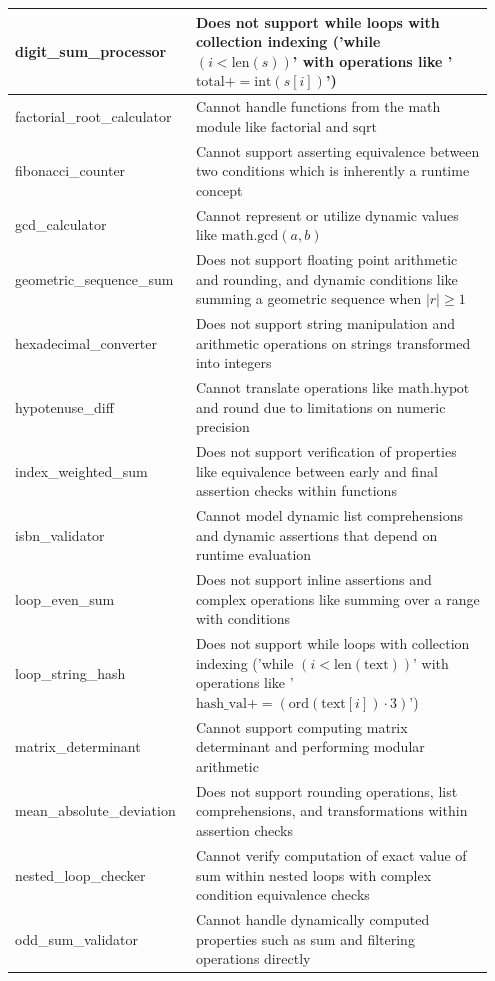 \documentclass[8pt]{extarticle}
\begin{document}
\begin{table}[H]
\begin{tabular}{|p{0.35\linewidth}|p{0.6\linewidth}|}
\hline
digit\_sum\_processor & Does not support while loops with collection indexing ('while $(i < \text{len}(s))$' with operations like '$\text{total} += \text{int}(s[i])$') \\
\hline
factorial\_root\_calculator & Cannot handle functions from the math module like $\text{factorial}$ and $\text{sqrt}$ \\
\hline
fibonacci\_counter & Cannot support asserting equivalence between two conditions which is inherently a runtime concept \\
\hline
gcd\_calculator & Cannot represent or utilize dynamic values like $\text{math.gcd}(a, b)$ \\
\hline
geometric\_sequence\_sum & Does not support floating point arithmetic and rounding, and dynamic conditions like summing a geometric sequence when $|r| \geq 1$ \\
\hline
hexadecimal\_converter & Does not support string manipulation and arithmetic operations on strings transformed into integers \\
\hline
hypotenuse\_diff & Cannot translate operations like $\text{math.hypot}$ and $\text{round}$ due to limitations on numeric precision \\
\hline
index\_weighted\_sum & Does not support verification of properties like equivalence between early and final assertion checks within functions \\
\hline
isbn\_validator & Cannot model dynamic list comprehensions and dynamic assertions that depend on runtime evaluation \\
\hline
loop\_even\_sum & Does not support inline assertions and complex operations like summing over a range with conditions \\
\hline
loop\_string\_hash & Does not support while loops with collection indexing ('while $(i < \text{len}(\text{text}))$' with operations like '$\text{hash\_val} += (\text{ord}(\text{text}[i]) \cdot 3)$') \\
\hline
matrix\_determinant & Cannot support computing matrix determinant and performing modular arithmetic \\
\hline
mean\_absolute\_deviation & Does not support rounding operations, list comprehensions, and transformations within assertion checks \\
\hline
nested\_loop\_checker & Cannot verify computation of exact value of sum within nested loops with complex condition equivalence checks \\
\hline
odd\_sum\_validator & Cannot handle dynamically computed properties such as sum and filtering operations directly \\

\end{tabular}
\end{table}
\end{document}
